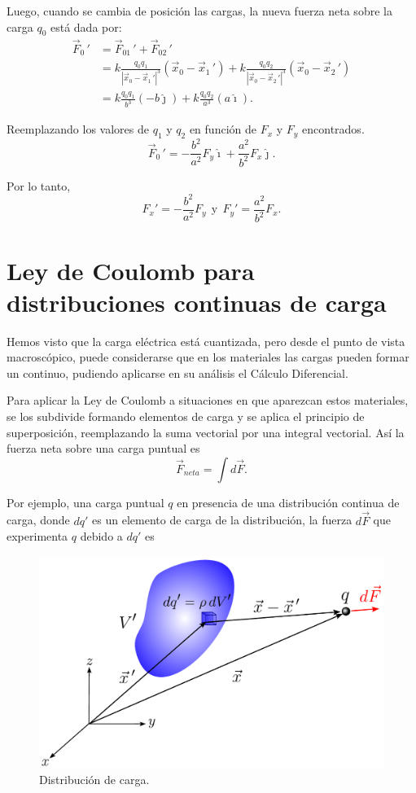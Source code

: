 \begin{ejemplo}
Luego, cuando se cambia de posición las cargas, la nueva fuerza neta sobre la carga $q_0$ está dada por:
\begin{align*}
    \vec{F}_0 \,' &= \vec{F}_{01}\,' + \vec{F}_{02}\,' \\
&= k \frac{q_0q_1}{|\vec{x}_0 - \vec{x}_1\,'|^3} (\vec{x}_0- \vec{x}_1\,') + k \frac{q_0q_2}{|\vec{x}_0 - \vec{x}_2\,'|^3} (\vec{x}_0- \vec{x}_2\,') \\
&= k \frac{q_0q_1}{b^3} (-b \hat{\jmath}) + k \frac{q_0q_2}{a^3} (a \hat{\imath}).
\end{align*}

Reemplazando los valores de $q_1$ y $q_2$ en función de $F_x$ y $F_y$ encontrados.
$$\vec{F}_0\,' = - \frac{b^2}{a^2}F_y \hat{\imath} + \frac{a^2}{b^2} F_x \hat{\jmath}.$$

Por lo tanto,
$$F_x' = - \frac{b^2}{a^2}F_y ~~\mbox{y}~~ F_y' = \frac{a^2}{b^2} F_x.$$

\end{ejemplo}

\section{Ley de Coulomb para distribuciones continuas de carga}

Hemos visto que la carga eléctrica está cuantizada, pero desde el punto de vista macroscópico, puede considerarse que en los materiales las cargas pueden formar un continuo, pudiendo aplicarse en su análisis el Cálculo Diferencial.


Para aplicar la Ley de Coulomb a situaciones en que aparezcan estos materiales, se los subdivide formando elementos de carga y se aplica el principio de superposición, reemplazando la suma vectorial por una integral vectorial. Así la fuerza neta sobre una carga puntual es
$$\vec{F}_{neta} = \int d \vec{F}.$$

Por ejemplo, una carga puntual $q$ en presencia de una distribución continua de carga, donde $dq'$ es un elemento de carga de la distribución, la fuerza $d\Vec{F}$ que experimenta $q$ debido a $dq'$ es

\begin{figure}[H]
    \centering
    \includegraphics[scale = 0.6]{Figuras/Distribucion-Cargas-Fuerza.pdf}
    \caption{Distribución de carga.}
    \label{fig:Distribu-Carga}
\end{figure}

